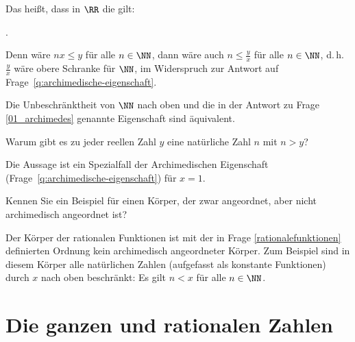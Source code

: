 \begin{antwort}
  Das heißt, dass in $\RR$ die  
   gilt:

  \medskip\noindent 
  . 

  \medskip
  \noindent
  Denn wäre $nx\le y$ für alle $n\in\NN$, dann wäre auch $n\le\frac yx$ für alle 
  $n\in\NN$, d.\,h. $\frac yx$ wäre obere Schranke für $\NN$, im Widerspruch zur 
  Antwort auf Frage~\ref{q:archimedische-eigenschaft}.

  \medskip
  \noindent
  Die Unbeschränktheit von $\NN$ nach oben und die in der Antwort zu Frage \ref{01_archimedes} 
  genannte Eigenschaft sind äquivalent.
  \AntEnd
\end{antwort}






\begin{frage}
  Warum gibt es zu jeder reellen Zahl $y$ eine natürliche Zahl $n$ mit $n>y$?
\end{frage}

\begin{antwort}
  Die Aussage ist ein Spezialfall der Archimedischen Eigenschaft  
  (Frage~\ref{q:archimedische-eigenschaft}) für $x=1$.
  \AntEnd
\end{antwort}






\begin{frage}
  Kennen Sie ein Beispiel für einen Körper, 
  der zwar angeordnet, aber nicht 
  archimedisch angeordnet ist?
\end{frage}

\begin{antwort}
  Der Körper der rationalen Funktionen ist mit der in Frage 
  \ref{rationalefunktionen} definierten 
  Ordnung kein archimedisch angeordneter Körper. Zum Beispiel sind in diesem 
  Körper alle natürlichen Zahlen (aufgefasst als konstante Funktionen) durch $x$ 
  nach oben beschränkt: Es gilt $n<x$ für alle $n\in\NN$.
  \AntEnd
\end{antwort}


\section{Die ganzen und rationalen Zahlen}






